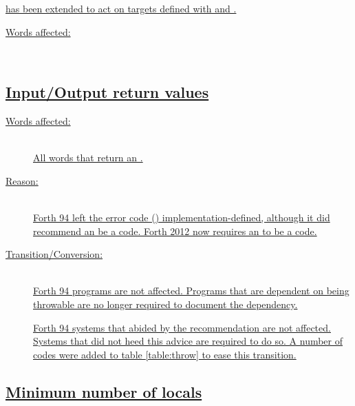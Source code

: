\uline{ has been extended to act on targets defined with
 and .}

\begin{description}
\item[\uline{Words affected:}] ~\\
	\uline{}
\end{description}


\subsection[Input/Output return values]{\uline{Input/Output return values}}
\label{diff:12:ior}

\begin{description}
\item[\uline{Words affected:}] ~\\
	\uline{All words that return an .}

\item[\uline{Reason:}] ~\\
	\uline{Forth 94 left the error code () implementation-defined,
	although it did recommend an  be a 
	code.  Forth 2012 now requires an  to be a
	 code.}

\item[\uline{Transition/Conversion:}] ~\\
	\uline{Forth 94 programs are not affected.  Programs that are dependent
	on  being throwable are no longer required to document the
	dependency.}

	\uline{Forth 94 systems that abided by the recommendation are not
	affected.  Systems that did not heed this advice are required to do so.
	A number of  codes were added to table
	\ref{table:throw} to ease this transition.}
\end{description}


\subsection[Minimum number of locals]{\uline{Minimum number of locals}}
\label{diff:12:locals}

